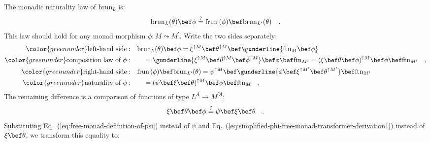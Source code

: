 The monadic naturality law of $\text{brun}_{L}$ is:
\[
\text{brun}_{L}(\theta)\bef\phi\overset{?}{=}\text{frun}\,(\phi)\bef\text{brun}_{L^{\prime}}(\theta)\quad.
\]
This law should hold for any monad morphism $\phi:M\leadsto M^{\prime}$.
Write the two sides separately:
\begin{align*}
{\color{greenunder}\text{left-hand side}:}\quad & \text{brun}_{L}(\theta)\bef\phi=\xi^{\uparrow M}\bef\theta^{\uparrow M}\bef\gunderline{\text{ftn}_{M}\bef\phi}\\
{\color{greenunder}\text{composition law of }\phi:}\quad & \quad=\gunderline{\xi^{\uparrow M}\bef\theta^{\uparrow M}\bef\phi^{\uparrow M}}\bef\phi\bef\text{ftn}_{M^{\prime}}=(\xi\bef\theta\bef\phi)^{\uparrow M}\bef\phi\bef\text{ftn}_{M^{\prime}}\quad,\\
{\color{greenunder}\text{right-hand side}:}\quad & \text{frun}\,(\phi)\bef\text{brun}_{L^{\prime}}(\theta)=\psi^{\uparrow M}\bef\gunderline{\phi\bef\xi^{\uparrow M^{\prime}}\bef\theta^{\uparrow M^{\prime}}}\bef\text{ftn}_{M^{\prime}}\\
{\color{greenunder}\text{naturality of }\phi:}\quad & \quad=(\psi\bef\xi\bef\theta)^{\uparrow M}\bef\phi\bef\text{ftn}_{M}\quad.
\end{align*}
The remaining difference is a comparison of functions of type $L^{A}\rightarrow M^{\prime A}$:
\begin{equation}
\xi\bef\theta\bef\phi\overset{?}{=}\psi\bef\xi\bef\theta\quad.\label{eq:monadic-naturality-free-monad-transformer-derivation1}
\end{equation}
Substituting Eq.~(\ref{eq:free-monad-definition-of-psi}) instead
of $\psi$ and Eq.~(\ref{eq:simplified-phi-free-monad-transformer-derivation1})
instead of $\xi\bef\theta$, we transform this equality to:

